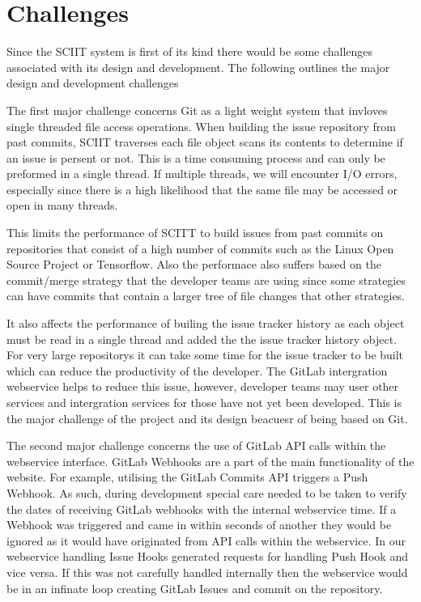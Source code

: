\documentclass{mproj}
\begin{document}
\section{Challenges}

Since the SCIIT system is first of its kind there would be some challenges associated with its design and development. The following outlines the major design and development challenges

The first major challenge concerns Git as a light weight system that invloves single threaded file access operations. When building the issue repository from past commits, SCIIT traverses each file object scans its contents to determine if an issue is persent or not. This is a time consuming process and can only be preformed in a single thread. If multiple threads, we will encounter I/O errors, especially since there is a high likelihood that the same file may be accessed or open in many threads. 

This limits the performance of SCITT to build issues from past commits on repositories that consist of a high number of commits such as the Linux Open Source Project or Tensorflow. Also the performace also suffers based on the commit/merge strategy that the developer teams are using since some strategies can have commits that contain a larger tree of file changes that other strategies. 

It also affects the performance of builing the issue tracker history as each object must be read in a single thread and added the the issue tracker history object. For very large repositorys it can take some time for the issue tracker to be built which can reduce the productivity of the developer. The GitLab intergration webservice helps to reduce this issue, however, developer teams may user other services and intergration services for those have not yet been developed. This is the major challenge of the project and its design beacuesr of being based on Git. %

The second major challenge concerns the use of GitLab API calls within the webservice interface. GitLab Webhooks are a part of the main functionality of the website. For example, utilising the GitLab Commits API triggers a Push Webhook. As such, during development special care needed to be taken to verify the dates of receiving GitLab webhooks with the internal webservice time. If a Webhook was triggered and came in within seconds of another they would be ignored as it would have originated from API calls within the webservice. In our webservice handling Issue Hooks generated requests for handling Push Hook and vice versa. If this was not carefully handled internally then the webservice would be in an infinate loop creating GitLab Issues and commit on the repository.
\end{document}
